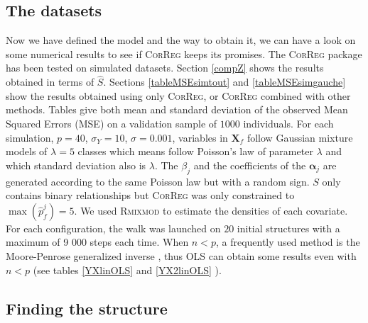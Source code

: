 \documentclass[11pt,a4paper]{article}
\begin{document}
	\subsection{The datasets}	
	Now we have defined the model and the way to obtain it, we can have a look on some numerical results to see if \textsc{CorReg} 	keeps its promises.
	The \textsc{CorReg} package has been tested on simulated datasets. 
Section \ref{compZ} shows the results obtained in terms of $\hat{S}$. Sections \ref{tableMSEsimtout} and \ref{tableMSEsimgauche} show the results obtained using only \textsc{CorReg}, or \textsc{CorReg} combined with other methods. Tables give both mean and standard deviation of the observed Mean Squared Errors (MSE) on a validation sample of $1 000$ individuals. For each simulation,  $p=40$, $\sigma_Y=10$, $\sigma=0.001$, variables in $\boldsymbol{X}_f$ follow Gaussian mixture models of $\lambda=5$ classes which means follow Poisson's law of parameter $\lambda$ and which standard deviation also is $\lambda$. The $\beta_j$ and the coefficients of the $\boldsymbol{\alpha}_j$ are generated according to the same Poisson law but with a random sign. $S$ only contains binary relationships but \textsc{CorReg} was only constrained to $\max (\hat{p}_f^j)=5$.  
	We used \textsc{Rmixmod} to estimate the densities of each covariate. For each configuration, the walk was launched on $20$ initial structures with a maximum of 9 000 steps each time.
	When $n<p$, a frequently used method is the Moore-Penrose generalized inverse \cite{katsikis2008fast}, thus OLS can obtain some results even with $n<p$ (see tables \ref{YXlinOLS} and \ref{YX2linOLS} ).
		\subsection{Finding the structure}
\end{document}
